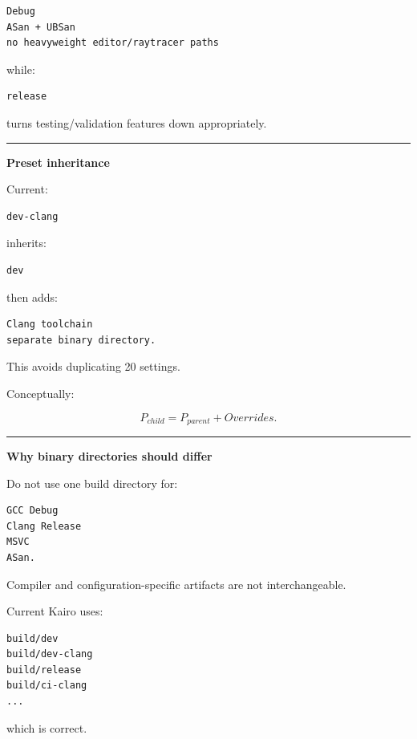 \begin{verbatim}
Debug
ASan + UBSan
no heavyweight editor/raytracer paths
\end{verbatim}

while:

\begin{verbatim}
release
\end{verbatim}

turns testing/validation features down appropriately.

\begin{center}\rule{0.5\linewidth}{0.5pt}\end{center}

\textbf{Preset inheritance}

Current:

\begin{verbatim}
dev-clang
\end{verbatim}

inherits:

\begin{verbatim}
dev
\end{verbatim}

then adds:

\begin{verbatim}
Clang toolchain
separate binary directory.
\end{verbatim}

This avoids duplicating 20 settings.

Conceptually:

\[
P_{child}
=
P_{parent}
+
Overrides.
\]

\begin{center}\rule{0.5\linewidth}{0.5pt}\end{center}

\textbf{Why binary directories should differ}

Do not use one build directory for:

\begin{verbatim}
GCC Debug
Clang Release
MSVC
ASan.
\end{verbatim}

Compiler and configuration-specific artifacts are not interchangeable.

Current Kairo uses:

\begin{verbatim}
build/dev
build/dev-clang
build/release
build/ci-clang
...
\end{verbatim}

which is correct.

